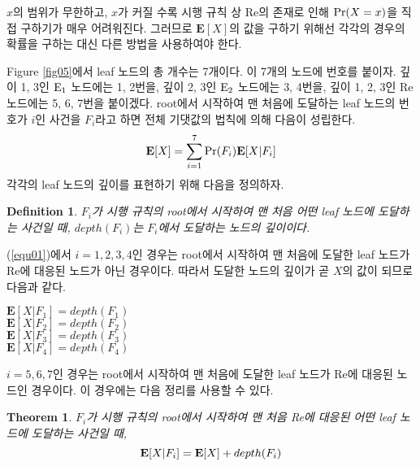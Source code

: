\documentclass[11pt]{article}
\newtheorem*{definition}{Definition}
\newtheorem{theorem}{Theorem}
\begin{document}
\noindent $x$의 범위가 무한하고, $x$가 커질 수록 시행 규칙 상 Re의 존재로 인해 $\textnormal{Pr}(X = x)$을 직접 구하기가 매우 어려워진다. 그러므로 $\textbf{E}[X]$의 값을 구하기 위해선 각각의 경우의 확률을 구하는 대신 다른 방법을 사용하여야 한다.

Figure \ref{fig05}에서 leaf 노드의 총 개수는 7개이다. 이 7개의 노드에 번호를 붙이자. 깊이 1, 3인 $\textnormal{E}_{1}$ 노드에는 1, 2번을, 깊이 2, 3인 $\textnormal{E}_{2}$ 노드에는 3, 4번을, 깊이 1, 2, 3인 Re 노드에는 5, 6, 7번을 붙이겠다. root에서 시작하여 맨 처음에 도달하는 leaf 노드의 번호가 $i$인 사건을 $F_{i}$라고 하면 전체 기댓값의 법칙에 의해 다음이 성립한다.
\begin{equation}
\textbf{E}[X] = \sum_{i=1}^{7} \textnormal{Pr}(F_{i}) \textbf{E}[X|F_{i}]
\label{equ01}
\end{equation}
각각의 leaf 노드의 깊이를 표현하기 위해 다음을 정의하자.
\begin{definition}
$F_{i}$가 시행 규칙의 root에서 시작하여 맨 처음 어떤 leaf 노드에 도달하는 사건일 때, $depth(F_{i})$는 $F_{i}$에서 도달하는 노드의 깊이이다.
\end{definition}

(\ref{equ01})에서 $i = 1,2,3,4$인 경우는 root에서 시작하여 맨 처음에 도달한 leaf 노드가 Re에 대응된 노드가 아닌 경우이다. 따라서 도달한 노드의 깊이가 곧 $X$의 값이 되므로 다음과 같다.

\singlespacing
\begin{center}
$\textbf{E}[X|F_{1}]=depth(F_{1})$\\
$\textbf{E}[X|F_{2}]=depth(F_{2})$\\
$\textbf{E}[X|F_{3}]=depth(F_{3})$\\
$\textbf{E}[X|F_{4}]=depth(F_{4})$\\
\end{center}
\doublespacing

$i = 5,6,7$인 경우는 root에서 시작하여 맨 처음에 도달한 leaf 노드가 Re에 대응된 노드인 경우이다. 이 경우에는 다음 정리를 사용할 수 있다.

\singlespacing
\begin{theorem}
$F_{i}$가 시행 규칙의 root에서 시작하여 맨 처음 Re에 대응된 어떤 leaf 노드에 도달하는 사건일 때,\\
\[\textnormal{\textbf{E}}[X|F_{i}]=\textnormal{\textbf{E}}[X]+depth(F_{i})\]
\label{thm03}
\end{theorem}
\doublespacing
\end{document}
